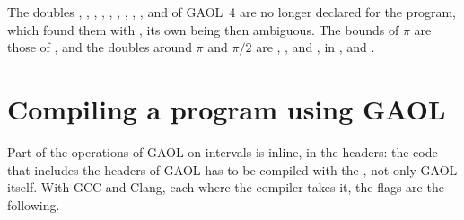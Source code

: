 \medskip
The doubles , , , ,
, , , ,
,  and  of GAOL~4 are
no longer declared for the program, which found them with , its own  being then ambiguous.\newinvfive{} The
bounds of $\pi$ are those of , and the doubles around
$\pi$ and $\pi/2$ are , ,
 and , in ,
 and .

\section{Compiling a program using GAOL}\label{sec:compiling}
%
%

Part of the operations of GAOL on intervals is inline, in the headers: the
code that includes the headers of GAOL has to be compiled with the , not only GAOL itself.\newinvfive{} With GCC and Clang, each where
the compiler takes it, the flags are the following.

